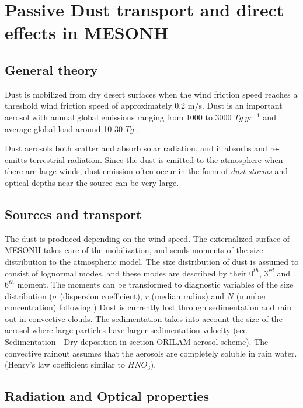 \chapter{Passive Dust transport and direct effects in MESONH}
\minitoc


\section{General theory}

Dust is mobilized from dry desert surfaces when the wind friction 
speed reaches a threshold wind friction speed of approximately
0.2 m/s. Dust is an important aerosol with annual global
 emissions ranging from 1000 to 3000 $Tg~yr^{-1}$ and average global
load around 10-30 $Tg$ \cite[]{zender04}.

Dust aerosols both scatter and absorb solar radiation, and it absorbs and
re-emitts terrestrial radiation. Since the dust is emitted to the atmosphere
when there are large winds, dust emission often occur in the form of
{\it dust storms} and optical depths near the source can be very large.


\section{Sources and transport}


The dust is produced depending on the wind speed. The externalized surface
of MESONH takes care of the mobilization, and sends moments of the size distribution
to the atmospheric model. The size distribution of dust is assumed to consist
of lognormal modes, and these modes are described by their $0^{th}$, $3^{rd}$ and
$6^{th}$ moment. The moments can be transformed to diagnostic variables of 
the size distribution ($\sigma$ (dispersion coefficient), $r$ (median radius) and
$N$ (number concentration) following \cite{tulet05})
Dust is currently lost through sedimentation and rain out in convective clouds.
The sedimentation takes into account the size of the aerosol where large particles
have larger sedimentation velocity (see Sedimentation - Dry deposition in section ORILAM aerosol scheme).
The convective rainout assumes that the 
aerosols are completely soluble in rain water. (Henry's law coefficient similar to $HNO_3$).

\section{Radiation and Optical properties}


